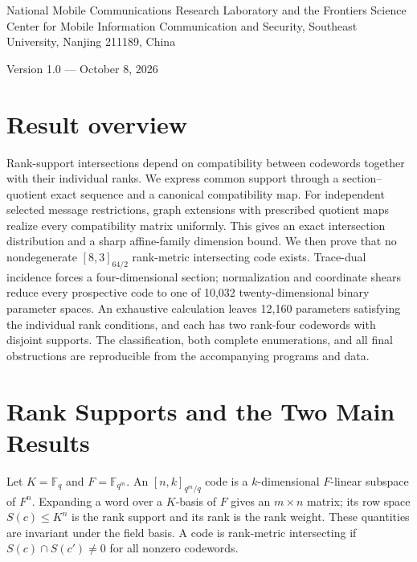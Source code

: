 \documentclass[12pt,letterpaper,onecolumn]{article}
\newcommand{\F}{\mathbb F}
\theoremstyle{definition}
\begin{document}
\par\medskip
{}\medskip
{}\par\smallskip
\noindent\begin{minipage}{\linewidth}\small National Mobile Communications Research Laboratory and the Frontiers Science Center for Mobile Information Communication and Security, Southeast University, Nanjing 211189, China\end{minipage}\par\medskip
\noindent Version 1.0 --- October 8, 2026\par\bigskip
{}
\section*{Result overview}
Rank-support intersections depend on compatibility between codewords together with their individual ranks. We express common support through a section--quotient exact sequence and a canonical compatibility map. For independent selected message restrictions, graph extensions with prescribed quotient maps realize every compatibility matrix uniformly. This gives an exact intersection distribution and a sharp affine-family dimension bound. We then prove that no nondegenerate $[8,3]_{64/2}$ rank-metric intersecting code exists. Trace-dual incidence forces a four-dimensional section; normalization and coordinate shears reduce every prospective code to one of 10,032 twenty-dimensional binary parameter spaces. An exhaustive calculation leaves 12,160 parameters satisfying the individual rank conditions, and each has two rank-four codewords with disjoint supports. The classification, both complete enumerations, and all final obstructions are reproducible from the accompanying programs and data.
\section{Rank Supports and the Two Main Results}
Let $K=\F_q$ and $F=\F_{q^m}$. An $[n,k]_{q^m/q}$ code is a $k$-dimensional $F$-linear subspace of $F^n$. Expanding a word over a $K$-basis of $F$ gives an $m\times n$ matrix; its row space $S(c)\le K^n$ is the rank support and its rank is the rank weight. These quantities are invariant under the field basis. A code is rank-metric intersecting if $S(c)\cap S(c')\ne0$ for all nonzero codewords.
\end{document}
